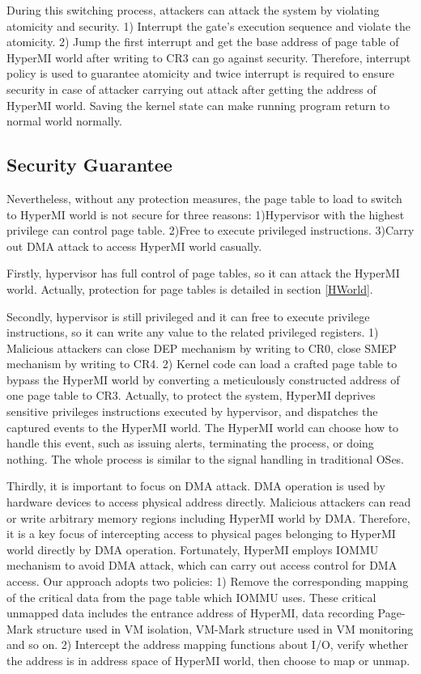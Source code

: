 \documentclass[conference]{IEEEtran}
\begin{document}
During this switching process, attackers can attack the system by violating atomicity and security. 1) Interrupt the gate's execution sequence and violate the atomicity. 2) Jump the first interrupt and get the base address of page table of HyperMI world after writing to CR3 can go against security. Therefore, interrupt policy is used to guarantee atomicity and twice interrupt is required to ensure security in case of attacker carrying out attack after getting the address of HyperMI world. Saving the kernel state can make running program return to normal world normally. 

\subsection{Security Guarantee}\label {SG}
Nevertheless, without any protection measures, the page table to load to switch to HyperMI world is not secure for three reasons: 1)Hypervisor with the highest privilege can control page table. 2)Free to execute privileged instructions. 3)Carry out DMA attack to access HyperMI world casually.

Firstly, hypervisor has full control of page tables, so it can attack the HyperMI world. Actually, protection for page tables is detailed in section \ref{HWorld}. 

Secondly, hypervisor is still privileged and it can free to execute privilege instructions, so it can write any value to the related privileged registers. 1) Malicious attackers can close DEP mechanism by writing to CR0, close SMEP mechanism by writing to CR4. 2) Kernel code can load a crafted page table to bypass the HyperMI world by converting a meticulously constructed address of one page table to CR3.
Actually, to protect the system, HyperMI deprives sensitive privileges instructions executed by hypervisor, and dispatches the captured events to the HyperMI world. The HyperMI world can choose how to handle this event, such as issuing alerts, terminating the process, or doing nothing. The whole process is similar to the signal handling in traditional OSes.

Thirdly, it is important to focus on DMA attack. DMA operation is used by hardware devices to access physical address directly. Malicious attackers can read or write arbitrary memory regions including HyperMI world by DMA. Therefore, it is a key focus of intercepting access to physical pages belonging to HyperMI world directly by DMA operation. 
Fortunately, HyperMI employs IOMMU mechanism to avoid DMA attack, which can carry out access control for DMA access. Our approach adopts two policies: 1) Remove the corresponding mapping of the critical data from the page table which IOMMU uses. These critical unmapped data includes the entrance address of HyperMI, data recording Page-Mark structure used in VM isolation, VM-Mark structure used in VM monitoring and so on. 2) Intercept the address mapping functions about I/O, verify whether the address is in address space of HyperMI world, then choose to map or unmap.
\end{document}
